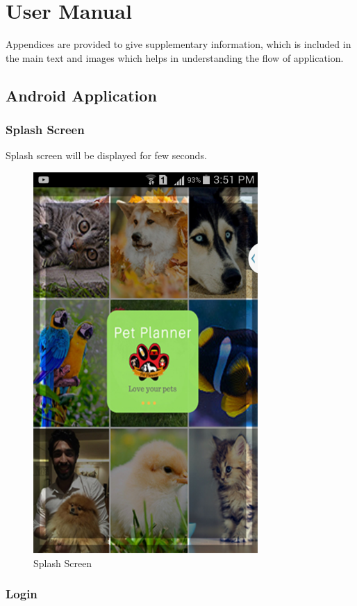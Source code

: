 \chapter{User Manual} \label{ap:Appendix1}

Appendices are provided to give supplementary information, which is included in the main text and images which helps in understanding the flow of application.
\section {Android Application}
\subsection{Splash Screen}
Splash screen will be displayed for few seconds.
\begin{figure}[H] 
  \centering
    \includegraphics{00}
    \caption{Splash Screen}
\end{figure}

\newpage
\subsection{Login}

